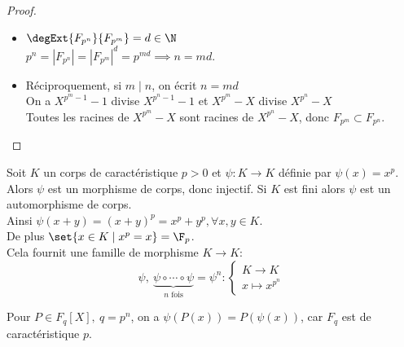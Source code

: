 \begin{proof}
	\begin{itemize}
		\item $\degExt {F_{p^n}}{F_{p^m}} = d \in \N$\\
		      $p^n = |F_{p^n}| = |F_{p^m}|^d = p^{md} \implies n = md$.

		\item Réciproquement, si $m \mid n$, on écrit $n = md$\\
		      On a $X^{p^m - 1} - 1$ divise $X^{p^n-1} - 1$  et $X^{p^m} - X$ divise $X^{p^n} - X$\\
		      Toutes les racines de $X^{p^m} - X$ sont racines de $X^{p^n} - X$, donc $F_{p^m} \subset F_{p^n}$.
	\end{itemize}
\end{proof}



\begin{remarque}
	Soit $K$ un corps de caractéristique $p >0$ et $\psi : K \to K$ définie par $\psi(x) = x^p$.\\
	Alors $\psi$ est un morphisme de corps, donc injectif. Si $K$ est fini alors $\psi$ est un automorphisme de corps.\\
	Ainsi $\psi(x + y) = (x+y)^p = x^p + y^p, \forall x,y \in K$.\\
	De plus $\set {x \in K \mid x^p = x} = \F_p$.\\
	Cela fournit une famille de morphisme $K \to K$:
	$$ \psi,\ \underbrace{\psi \circ \cdots \circ \psi}_{n \text{ fois}} = \psi^n : \begin{cases}
			K \to K \\
			x \mapsto x^{p^n}
		\end{cases}$$

	Pour $P \in F_q[X], \ q = p^n$, on a $\psi(P(x)) = P (\psi(x))$, car $F_q$ est de caractéristique $p$.
\end{remarque}




